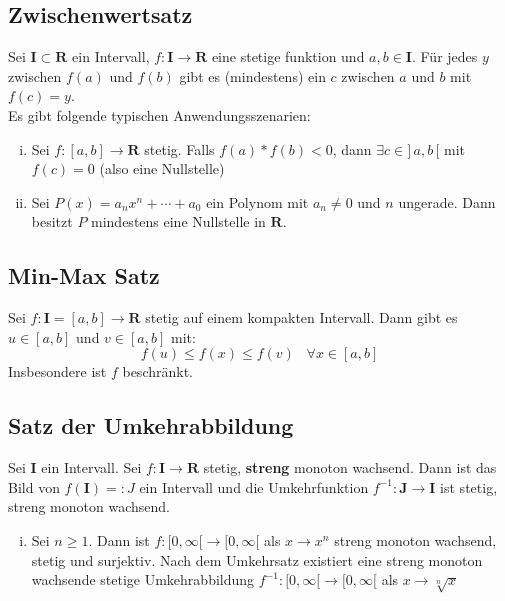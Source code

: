\documentclass[8pt]{extarticle}
\begin{document}
\begin{multicols*}{3}
\subsection{Zwischenwertsatz}

Sei $\mathbf{I} \subset \mathbf{R}$ ein Intervall, $f:\mathbf{I} \rightarrow \mathbf{R}$ eine
stetige funktion und $a, b \in \mathbf{I}$. Für jedes $y$ zwischen $f(a)$ und $f(b)$
gibt es (mindestens) ein $c$ zwischen $a$ und $b$ mit $f(c) = y$.\\
Es gibt folgende typischen Anwendungsszenarien:
\begin{enumerate}[(i)]
  \item Sei $f:[a, b] \rightarrow \mathbf{R}$ stetig. Falls $f(a)*f(b) < 0$, dann
  $\exists c \in ]\,a, b\,[$ mit $f(c) = 0$ (also eine Nullstelle)
  \item Sei $P(x) = a_nx^n + \cdots + a_0$ ein Polynom mit $a_n \neq 0$ und $n$ ungerade.
  Dann besitzt $P$ mindestens eine Nullstelle in $\mathbf{R}$.
\end{enumerate}

\subsection{Min-Max Satz}

Sei $f:\mathbf{I}=[a, b] \rightarrow \mathbf{R}$ stetig auf einem kompakten Intervall.
Dann gibt es $u \in [a, b]$ und $v \in [a, b]$ mit:
$$
  f(u) \leq f(x) \leq f(v) \;\;\; \forall x \in [a, b]
$$
Insbesondere ist $f$ beschränkt.

\subsection{Satz der Umkehrabbildung}

Sei $\mathbf{I}$ ein Intervall. Sei $f:\mathbf{{I} \rightarrow \mathbf{R}}$ stetig, \textbf{streng} monoton
wachsend. Dann ist das Bild von $f(\mathbf{I}) =: J$ ein Intervall und die Umkehrfunktion
$f^{-1}: \mathbf{J} \rightarrow \mathbf{I}$ ist stetig, streng monoton wachsend.
\begin{enumerate}[(i)]
  \item Sei $n \geq 1$. Dann ist $f:[0, \infty[ \rightarrow [0, \infty[$ als $x \rightarrow x^n$
  streng monoton wachsend, stetig und surjektiv. Nach dem Umkehrsatz existiert eine streng monoton
  wachsende stetige Umkehrabbildung $f^{-1}:[0, \infty[ \rightarrow [0, \infty[$ als $x \rightarrow \sqrt[n]{x}$
\end{enumerate}


\end{multicols*}
\end{document}
